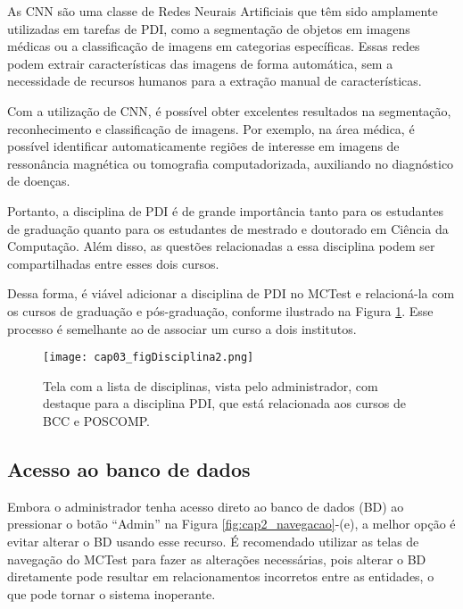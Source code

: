 As CNN são uma classe de Redes Neurais Artificiais que têm sido amplamente utilizadas em tarefas de PDI, como a segmentação de objetos em imagens médicas ou a classificação de imagens em categorias específicas. Essas redes podem extrair características das imagens de forma automática, sem a necessidade de recursos humanos para a extração manual de características.

Com a utilização de CNN, é possível obter excelentes resultados na segmentação, reconhecimento e classificação de imagens. Por exemplo, na área médica, é possível identificar automaticamente regiões de interesse em imagens de ressonância magnética ou tomografia computadorizada, auxiliando no diagnóstico de doenças.

Portanto, a disciplina de PDI é de grande importância tanto para os estudantes de graduação quanto para os estudantes de mestrado e doutorado em Ciência da Computação. Além disso, as questões relacionadas a essa disciplina podem ser compartilhadas entre esses dois cursos.

Dessa forma, é viável adicionar a disciplina de PDI no MCTest e relacioná-la com os cursos de graduação e pós-graduação, conforme ilustrado na Figura \ref{fig:cap03_figDisciplina2}. Esse processo é semelhante ao de associar um curso a dois institutos.

\begin{figure}[!ht]
  \centering
  \texttt{[image: cap03\_figDisciplina2.png]}
  \caption{Tela com a lista de disciplinas, vista pelo  administrador, com destaque para a disciplina PDI, que está relacionada aos cursos de BCC e POSCOMP.}
  \label{fig:cap03_figDisciplina2}
\end{figure}

\subsection{Acesso ao banco de dados}

Embora o administrador tenha acesso direto ao banco de dados (BD) ao pressionar o botão ``Admin'' na Figura \ref{fig:cap2_navegacao}-(e), a melhor opção é evitar alterar o BD usando esse recurso. É recomendado utilizar as telas de navegação do MCTest para fazer as alterações necessárias, pois alterar o BD diretamente pode resultar em relacionamentos incorretos entre as entidades, o que pode tornar o sistema inoperante. %

